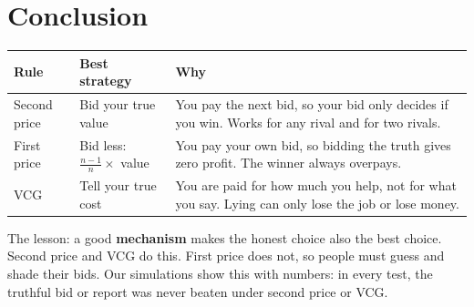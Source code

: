\documentclass[11pt,a4paper]{article}
\begin{document}
\section{Conclusion}

\begin{center}
\renewcommand{\arraystretch}{1.3}
\begin{tabularx}{0.95\linewidth}{|l|l|X|}
\hline
\rowcolor{rowblue} \textbf{Rule} & \textbf{Best strategy} & \textbf{Why} \\
\hline
Second price & Bid your true value & You pay the next bid, so your bid only decides if you win. Works for any rival and for two rivals. \\ \hline
First price & Bid less: $\frac{n-1}{n}\times$ value & You pay your own bid, so bidding the truth gives zero profit. The winner always overpays. \\ \hline
VCG & Tell your true cost & You are paid for how much you help, not for what you say. Lying can only lose the job or lose money. \\
\hline
\end{tabularx}
\end{center}

The lesson: a good \textbf{mechanism} makes the honest choice also the best choice.
Second price and VCG do this. First price does not, so people must guess and shade their bids.
Our simulations show this with numbers: in every test, the truthful bid or report was never beaten under second price or VCG.
\end{document}
